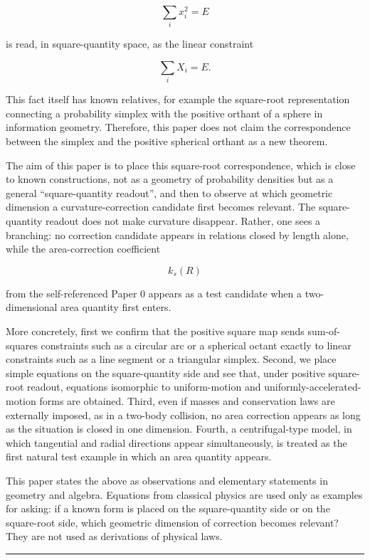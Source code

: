 \documentclass[
]{ltjsarticle}
\begin{document}
\[
\sum_i x_i^2=E
\]

is read, in square-quantity space, as the linear constraint

\[
\sum_i X_i=E.
\]

This fact itself has known relatives, for example the square-root
representation connecting a probability simplex with the positive
orthant of a sphere in information geometry. Therefore, this paper does
not claim the correspondence between the simplex and the positive
spherical orthant as a new theorem.

The aim of this paper is to place this square-root correspondence, which
is close to known constructions, not as a geometry of probability
densities but as a general ``square-quantity readout'', and then to
observe at which geometric dimension a curvature-correction candidate
first becomes relevant. The square-quantity readout does not make
curvature disappear. Rather, one sees a branching: no correction
candidate appears in relations closed by length alone, while the
area-correction coefficient

\[
k_s(R)
\]

from the self-referenced Paper 0 appears as a test candidate when a
two-dimensional area quantity first enters.

More concretely, first we confirm that the positive square map sends
sum-of-squares constraints such as a circular arc or a spherical octant
exactly to linear constraints such as a line segment or a triangular
simplex. Second, we place simple equations on the square-quantity side
and see that, under positive square-root readout, equations isomorphic
to uniform-motion and uniformly-accelerated-motion forms are obtained.
Third, even if masses and conservation laws are externally imposed, as
in a two-body collision, no area correction appears as long as the
situation is closed in one dimension. Fourth, a centrifugal-type model,
in which tangential and radial directions appear simultaneously, is
treated as the first natural test example in which an area quantity
appears.

This paper states the above as observations and elementary statements in
geometry and algebra. Equations from classical physics are used only as
examples for asking: if a known form is placed on the square-quantity
side or on the square-root side, which geometric dimension of correction
becomes relevant? They are not used as derivations of physical laws.

\begin{center}\rule{0.5\linewidth}{0.5pt}\end{center}
\end{document}
